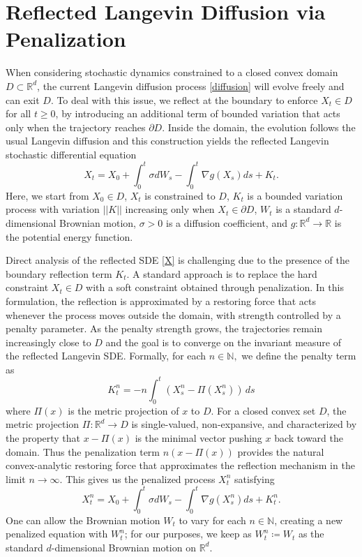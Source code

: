 \documentclass[amsfonts, reqno]{amsart}
\theoremstyle{definition}
\theoremstyle{remark}
\newcommand{\bbR}{\mathbb{R}}
\newcommand{\bbN}{\mathbb{N}}
\numberwithin{equation}{section}
\begin{document}
\section{Reflected Langevin Diffusion via Penalization}
When considering stochastic dynamics constrained to a closed convex domain $D \subset \bbR^d$, the current Langevin diffusion process \eqref{diffusion} will evolve freely and can exit $D$. To deal with this issue, we reflect at the boundary to enforce $X_t \in D$ for all $t \geq 0$, by introducing an additional term of bounded variation that acts only when the trajectory reaches $\partial D$. Inside the domain, the evolution follows the usual Langevin diffusion and this construction yields the reflected Langevin stochastic differential equation
\begin{equation} \label{X}
X_t =X_0 + \int_{0}^{t} \sigma dW_s -\int_{0}^{t}\nabla g(X_s) ds +K_t.
\end{equation}
Here, we start from $X_0 \in D$, $X_t$ is constrained to $D$, $K_t$ is a bounded variation process with variation $||K||$ increasing only when $X_t \in \partial D$, $W_t$ is a standard $d$-dimensional Brownian motion, $\sigma > 0$ is a diffusion coefficient, and $g: \bbR^d \to \bbR$ is the potential energy function. 

Direct analysis of the reflected SDE \eqref{X} is challenging 
due to the presence of the boundary reflection term $K_t$.  
A standard approach is to replace the hard constraint $X_t \in D$ with a 
soft constraint obtained through penalization. In this formulation, the reflection is approximated by a restoring force that 
acts whenever the process moves outside the domain, with strength controlled by 
a penalty parameter. As the penalty strength grows, the trajectories remain increasingly close to $D$ and the goal is to converge on the invariant measure of the reflected Langevin SDE. Formally, for each $n \in \bbN,$ we define the penalty term as \begin{equation} \label{K}
K_t^n = -n \int_{0}^{t} \left( X_s^n - \Pi(X_s^n) \right) \,ds
\end{equation} where $\Pi(x)$ is the metric projection of $x$ to $D$. For a closed convex set $D$, the metric projection $\Pi:\mathbb{R}^d\to D$ is
single-valued, non-expansive, and characterized by the property that
$x-\Pi(x)$ is the minimal vector pushing $x$ back toward the domain.
Thus the penalization term $n(x-\Pi(x))$ provides the natural convex-analytic
restoring force that approximates the reflection mechanism in the limit
$n\to\infty$. This gives us the penalized process $X_t^n$ satisfying \begin{equation} \label{Xn}
X_t^n =X_0 + \int_{0}^{t} \sigma dW_s -\int_{0}^{t}\nabla g(X_s^n) ds +K_t^n.
\end{equation}
One can allow the Brownian motion $W_t$ to vary for each $n \in \bbN$, creating a new penalized equation with $W_t^n$; for our purposes, we keep as $W_t^n \coloneqq W_t$ as the standard $d$-dimensional Brownian motion on $\bbR^d.$ 
\end{document}
